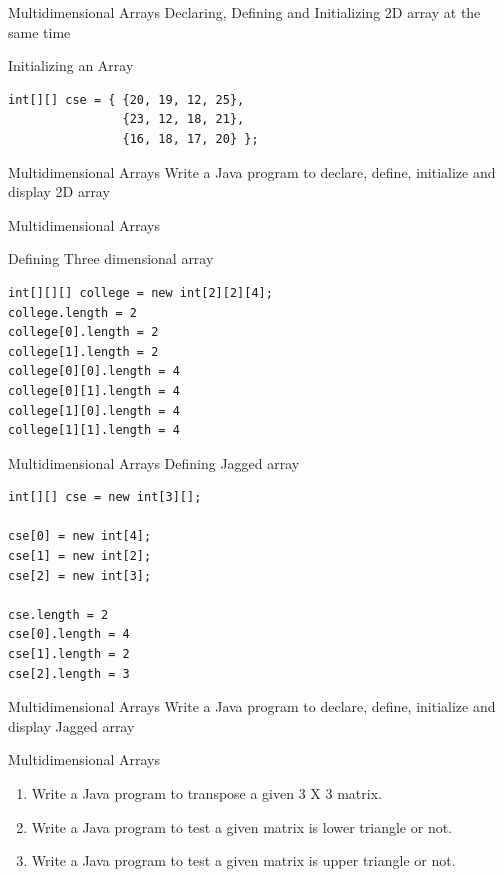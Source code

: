 \documentclass[14pt]{beamer}
\begin{document}
\begin{frame}[fragile]{Multidimensional Arrays}
Declaring, Defining and Initializing 2D array at the same time
\begin{block}{Initializing an Array}
\begin{lstlisting}[numbers=none]
int[][] cse = { {20, 19, 12, 25},
                {23, 12, 18, 21},
                {16, 18, 17, 20} };
\end{lstlisting}
\end{block}
\end{frame}

\begin{frame}{Multidimensional Arrays}
Write a Java program to declare, define, initialize and display 2D array
\end{frame}

\begin{frame}[fragile]{Multidimensional Arrays}
\begin{block}{Defining  Three dimensional array}
\begin{lstlisting}[numbers=none]
int[][][] college = new int[2][2][4];
college.length = 2
college[0].length = 2
college[1].length = 2
college[0][0].length = 4
college[0][1].length = 4
college[1][0].length = 4
college[1][1].length = 4
\end{lstlisting}
\end{block}
\end{frame}

\begin{frame}[fragile]{Multidimensional Arrays}
Defining  Jagged array
\begin{lstlisting}[numbers=none]
int[][] cse = new int[3][];

cse[0] = new int[4];
cse[1] = new int[2];
cse[2] = new int[3];

cse.length = 2
cse[0].length = 4
cse[1].length = 2
cse[2].length = 3
\end{lstlisting}
\end{frame}

\begin{frame}{Multidimensional Arrays}
Write a Java program to declare, define, initialize and display Jagged array
\end{frame}

\begin{frame}{Multidimensional Arrays}
\begin{enumerate}
\item Write a Java program to transpose a given 3 X 3 matrix.

\item Write a Java program to test a given matrix is lower triangle or not.

\item Write a Java program to test a given matrix is upper triangle or not.

\end{enumerate}
\end{frame}
\end{document}
